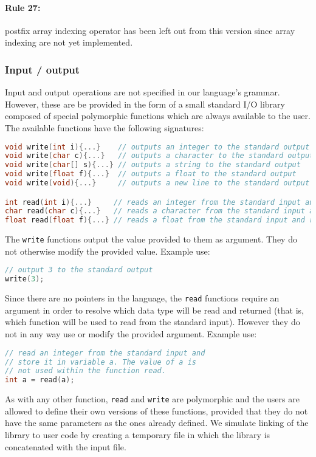 \paragraph{Rule 27:} postfix array indexing operator has been left out from this version since
array indexing are not yet implemented.

\subsubsection{Input / output}
Input and output operations are not specified in our language's grammar. However, these are be provided
in the form of a small standard I/O library composed of special polymorphic functions which are always
available to the user. The available functions have the following signatures:

\begin{lstlisting}[language=C]
void write(int i){...}    // outputs an integer to the standard output
void write(char c){...}   // outputs a character to the standard output
void write(char[] s){...} // outputs a string to the standard output
void write(float f){...}  // outputs a float to the standard output
void write(void){...}     // outputs a new line to the standard output

int read(int i){...}     // reads an integer from the standard input and returns it
char read(char c){...}   // reads a character from the standard input and returns it
float read(float f){...} // reads a float from the standard input and returns it
\end{lstlisting}

The \texttt{write} functions output the value provided to them as argument. They do not
otherwise modify the provided value. Example use:

\begin{lstlisting}[language=C]
// output 3 to the standard output
write(3);
\end{lstlisting}

Since there are no pointers in the language, the \texttt{read} functions require an argument
in order to resolve which data type will be read and returned (that is, which function
will be used to read from the standard input). However they do not in any way use or modify the
provided argument. Example use:

\begin{lstlisting}[language=C]
// read an integer from the standard input and
// store it in variable a. The value of a is
// not used within the function read.
int a = read(a);
\end{lstlisting}

As with any other function, \texttt{read} and \texttt{write} are polymorphic and the users are
allowed to define their own versions of these functions, provided that they do not have the same parameters
as the ones already defined. We simulate linking of the library to user code by creating a temporary file
in which the library is concatenated with the input file.

